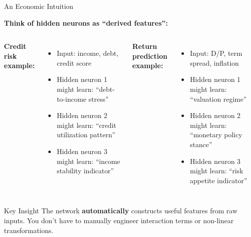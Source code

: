 \documentclass[10pt]{beamer}
\newcommand{\highlight}[1]{\textcolor{AccentOrange}{\textbf{#1}}}
\begin{document}
\begin{frame}{An Economic Intuition}

  \textbf{Think of hidden neurons as ``derived features'':}

  \vspace{1em}
  \begin{columns}[T]
    \textbf{Credit risk example:}
    \begin{itemize}
      \item Input: income, debt, credit score
      \item Hidden neuron 1 might learn: ``debt-to-income stress''
      \item Hidden neuron 2 might learn: ``credit utilization pattern''
      \item Hidden neuron 3 might learn: ``income stability indicator''
    \end{itemize}

    \textbf{Return prediction example:}
    \begin{itemize}
      \item Input: D/P, term spread, inflation
      \item Hidden neuron 1 might learn: ``valuation regime''
      \item Hidden neuron 2 might learn: ``monetary policy stance''
      \item Hidden neuron 3 might learn: ``risk appetite indicator''
    \end{itemize}
  \end{columns}

  \vspace{1em}
  \begin{block}{Key Insight}
    The network \highlight{automatically} constructs useful features from raw inputs. You don't have to manually engineer interaction terms or non-linear transformations.
  \end{block}
\end{frame}

\end{document}
